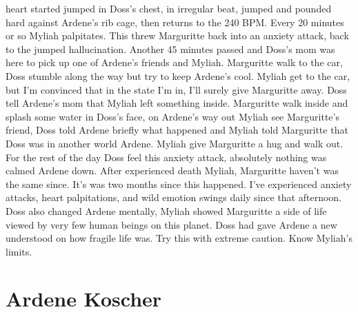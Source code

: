 \documentclass[12pt]{book}
\begin{document}
heart started jumped in Doss's chest, in irregular beat, jumped and pounded hard against Ardene's rib cage, then returns to the 240 BPM. Every 20 minutes or so Myliah palpitates. This threw Marguritte back into an anxiety attack, back to the jumped hallucination. Another 45 minutes passed and Doss's mom was here to pick up one of Ardene's friends and Myliah. Marguritte walk to the car, Doss stumble along the way but try to keep Ardene's cool. Myliah get to the car, but I'm convinced that in the state I'm in, I'll surely give Marguritte away. Doss tell Ardene's mom that Myliah left something inside. Marguritte walk inside and splash some water in Doss's face, on Ardene's way out Myliah see Marguritte's friend, Doss told Ardene briefly what happened and Myliah told Marguritte that Doss was in another world Ardene. Myliah give Marguritte a hug and walk out. For the rest of the day Doss feel this anxiety attack, absolutely nothing was calmed Ardene down. After experienced death Myliah, Marguritte haven't was the same since. It's was two months since this happened. I've experienced anxiety attacks, heart palpitations, and wild emotion swings daily since that afternoon. Doss also changed Ardene mentally, Myliah showed Marguritte a side of life viewed by very few human beings on this planet. Doss had gave Ardene a new understood on how fragile life was. Try this with extreme caution. Know Myliah's limits.



\chapter{Ardene Koscher}
\end{document}
